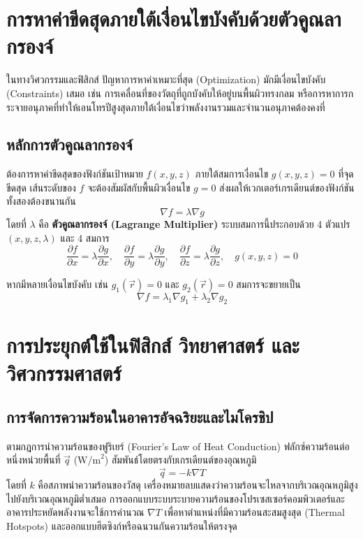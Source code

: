 \section{การหาค่าขีดสุดภายใต้เงื่อนไขบังคับด้วยตัวคูณลากรองจ์}
ในทางวิศวกรรมและฟิสิกส์ ปัญหาการหาค่าเหมาะที่สุด (Optimization) มักมีเงื่อนไขบังคับ (Constraints) เสมอ เช่น การเคลื่อนที่ของวัตถุที่ถูกบังคับให้อยู่บนพื้นผิวทรงกลม หรือการหาการกระจายอนุภาคที่ทำให้เอนโทรปีสูงสุดภายใต้เงื่อนไขว่าพลังงานรวมและจำนวนอนุภาคต้องคงที่

\subsection{หลักการตัวคูณลากรองจ์}
ต้องการหาค่าขีดสุดของฟังก์ชันเป้าหมาย $f(x, y, z)$ ภายใต้สมการเงื่อนไข $g(x, y, z) = 0$ 
ที่จุดขีดสุด เส้นระดับของ $f$ จะต้องสัมผัสกับพื้นผิวเงื่อนไข $g = 0$ ส่งผลให้เวกเตอร์เกรเดียนต์ของฟังก์ชันทั้งสองต้องขนานกัน
\begin{equation}
\nabla f = \lambda \nabla g
\end{equation}
โดยที่ $\lambda$ คือ \textbf{ตัวคูณลากรองจ์ (Lagrange Multiplier)} ระบบสมการนี้ประกอบด้วย 4 ตัวแปร $(x, y, z, \lambda)$ และ 4 สมการ
\begin{equation}
\frac{\partial f}{\partial x} = \lambda \frac{\partial g}{\partial x}, \quad \frac{\partial f}{\partial y} = \lambda \frac{\partial g}{\partial y}, \quad \frac{\partial f}{\partial z} = \lambda \frac{\partial g}{\partial z}, \quad g(x, y, z) = 0
\end{equation}

หากมีหลายเงื่อนไขบังคับ เช่น $g_1(\vec{r}) = 0$ และ $g_2(\vec{r}) = 0$ สมการจะขยายเป็น
\begin{equation}
\nabla f = \lambda_1 \nabla g_1 + \lambda_2 \nabla g_2
\end{equation}

\section{การประยุกต์ใช้ในฟิสิกส์ วิทยาศาสตร์ และวิศวกรรมศาสตร์}
\subsection{การจัดการความร้อนในอาคารอัจฉริยะและไมโครชิป}
ตามกฎการนำความร้อนของฟูริเยร์ (Fourier's Law of Heat Conduction) ฟลักซ์ความร้อนต่อหนึ่งหน่วยพื้นที่ $\vec{q}$ ($\text{W/m}^2$) สัมพันธ์โดยตรงกับเกรเดียนต์ของอุณหภูมิ
\begin{equation}
\vec{q} = -k \nabla T
\end{equation}
โดยที่ $k$ คือสภาพนำความร้อนของวัสดุ เครื่องหมายลบแสดงว่าความร้อนจะไหลจากบริเวณอุณหภูมิสูงไปยังบริเวณอุณหภูมิต่ำเสมอ การออกแบบระบบระบายความร้อนของโปรเซสเซอร์คอมพิวเตอร์และอาคารประหยัดพลังงานจะใช้การคำนวณ $\nabla T$ เพื่อหาตำแหน่งที่มีความร้อนสะสมสูงสุด (Thermal Hotspots) และออกแบบฮีตซิงก์หรือฉนวนกันความร้อนให้ตรงจุด

